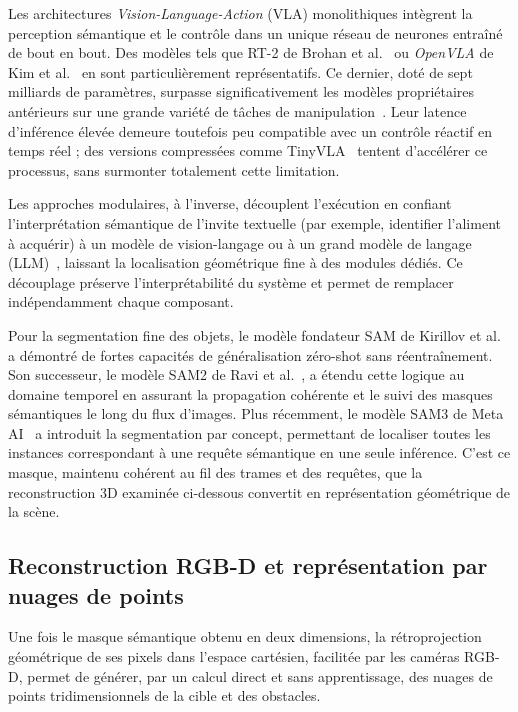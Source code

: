 Les architectures \textit{Vision-Language-Action} (\ac{VLA}) monolithiques intègrent la perception sémantique et le contrôle dans un unique réseau de neurones entraîné de bout en bout. Des modèles tels que RT-2 de Brohan et al.~\cite{Brohan2023Vision} ou \textit{OpenVLA} de Kim et al.~\cite{Kim2024Openvla} en sont particulièrement représentatifs. Ce dernier, doté de sept milliards de paramètres, surpasse significativement les modèles propriétaires antérieurs sur une grande variété de tâches de manipulation~\cite{Sapkota2026Vision,Li2025Foundation}. Leur latence d'inférence élevée demeure toutefois peu compatible avec un contrôle réactif en temps réel ; des versions compressées comme TinyVLA~\cite{Wen2025Tinyvla} tentent d'accélérer ce processus, sans surmonter totalement cette limitation.

Les approches modulaires, à l'inverse, découplent l'exécution en confiant l'interprétation sémantique de l'invite textuelle (par exemple, identifier l'aliment à acquérir) à un modèle de vision-langage ou à un grand modèle de langage (\ac{LLM})~\cite{Liu2024Vision,Mees2022What,Ingelhag2024Skill,Yin2025Codediffuser}, laissant la localisation géométrique fine à des modules dédiés. Ce découplage préserve l'interprétabilité du système et permet de remplacer indépendamment chaque composant.

Pour la segmentation fine des objets, le modèle fondateur \ac{SAM} de Kirillov et al.~\cite{Kirillov2023Sam} a démontré de fortes capacités de généralisation zéro-shot sans réentraînement. Son successeur, le modèle \ac{SAM}2 de Ravi et al.~\cite{Ravi2024Sam2}, a étendu cette logique au domaine temporel en assurant la propagation cohérente et le suivi des masques sémantiques le long du flux d'images. Plus récemment, le modèle \ac{SAM}3 de Meta AI~\cite{Meta2025Sam3} a introduit la segmentation par concept, permettant de localiser toutes les instances correspondant à une requête sémantique en une seule inférence. C'est ce masque, maintenu cohérent au fil des trames et des requêtes, que la reconstruction 3D examinée ci-dessous convertit en représentation géométrique de la scène.

\subsection{Reconstruction \acs{RGB-D} et représentation par nuages de points}
Une fois le masque sémantique obtenu en deux dimensions, la rétroprojection géométrique de ses pixels dans l'espace cartésien, facilitée par les caméras \ac{RGB-D}, permet de générer, par un calcul direct et sans apprentissage, des nuages de points tridimensionnels de la cible et des obstacles.

